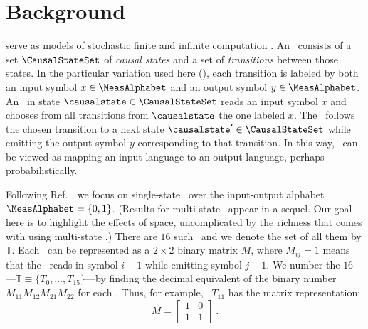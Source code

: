 \documentclass[pre,twocolumn,showpacs,superscriptaddress,preprintnumbers,floatfix]{revtex4}
\theoremstyle{plain}    \newtheorem{Lem}{Lemma}
\theoremstyle{plain}    \newtheorem*{ProLem}{Proof}
\theoremstyle{plain}    \newtheorem{Cor}{Corollary}
\theoremstyle{plain}    \newtheorem*{ProCor}{Proof}
\theoremstyle{plain}    \newtheorem{The}{Theorem}
\theoremstyle{plain}    \newtheorem*{ProThe}{Proof}
\theoremstyle{plain}    \newtheorem{Prop}{Proposition}
\theoremstyle{plain}    \newtheorem*{ProProp}{Proof}
\theoremstyle{plain}    \newtheorem*{Conj}{Conjecture}
\theoremstyle{plain}    \newtheorem*{Rem}{Remark}
\theoremstyle{plain}    \newtheorem{Def}{Definition}
\theoremstyle{plain}    \newtheorem*{Not}{Notation}
\newcommand{\T}{\mathbb{T}}
\begin{document}
\vspace{-0.2in}
\section{Background}
\vspace{-0.1in}

\emph{\EMs} serve as models of stochastic finite and infinite computation
\cite{CMechMerge}. An \eM\ consists of a set $\CausalStateSet$ of
\emph{causal states} and a set of \emph{transitions} between those states. In
the particular variation used here (\eTs), each transition is labeled by both an
input symbol $x \in \MeasAlphabet$ and an output symbol $y \in \MeasAlphabet$.
An \eM\ in state $\causalstate \in \CausalStateSet$ reads an input symbol $x$
and chooses from all transitions from $\causalstate$ the one labeled $x$.
The \eM\ follows the chosen transition to a next state
$\causalstate^\prime \in \CausalStateSet$ while emitting the
output symbol $y$ corresponding to that transition. In this way, \eMs\ can be
viewed as mapping an input language to an output language, perhaps
probabilistically. 

Following Ref. \cite{OTMOMerge}, we focus on single-state
\eMs\ over the input-output alphabet $\MeasAlphabet = \lbrace 0, 1 \rbrace$.
(Results for multi-state \eMs\ appear in a sequel. Our goal here is to
highlight the effects of space, uncomplicated by the richness that comes with
using multi-state \eMs.) There are $16$ such \eMs\ and we denote the set of all
them by $\T$. Each \eM\ can be represented as a $2 \times 2$ binary matrix $M$,
where $M_{ij} = 1$ means that the \eM\ reads in symbol $i-1$ while emitting
symbol $j-1$. We number the $16$
\eMs---$\T \equiv \{ T_0, \ldots, T_{15} \}$---by
finding the decimal equivalent of the binary number
$M_{11} M_{12} M_{21} M_{22}$ for
each \eM. Thus, for example, \eM\ $T_{11}$ has the matrix representation:
\begin{equation}
M =
  \left[
  \begin{array}{cc}
	1&0\\
	1&1
  \end{array}
  \right] ~.
\end{equation}
\end{document}
